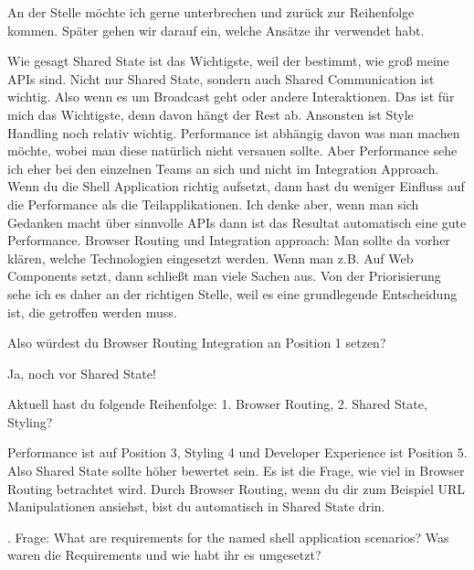 \begin{description}
    \NicoVogel An der Stelle möchte ich gerne unterbrechen und zurück zur Reihenfolge kommen. Später gehen wir darauf ein, welche Ansätze ihr verwendet habt.

    \BerndOlleck Wie gesagt Shared State ist das Wichtigste, weil der bestimmt, wie groß meine APIs sind. Nicht nur Shared State, sondern auch Shared Communication ist wichtig. Also wenn es um Broadcast geht oder andere Interaktionen. Das ist für mich das Wichtigste, denn davon hängt der Rest ab.
    Ansonsten ist Style Handling noch relativ wichtig. Performance ist abhängig davon was man machen möchte, wobei man diese natürlich nicht versauen sollte. Aber Performance sehe ich eher bei den einzelnen Teams an sich und nicht im Integration Approach. Wenn du die Shell Application richtig aufsetzt, dann hast du weniger Einfluss auf die Performance als die Teilapplikationen. Ich denke aber, wenn man sich Gedanken macht über sinnvolle APIs dann ist das Resultat automatisch eine gute Performance.
    Browser Routing und Integration approach: Man sollte da vorher klären, welche Technologien eingesetzt werden. Wenn man z.B. Auf Web Components setzt, dann schließt man viele Sachen aus. Von der Priorisierung sehe ich es daher an der richtigen Stelle, weil es eine grundlegende Entscheidung ist, die getroffen werden muss.

    \NicoVogel Also würdest du Browser Routing Integration an Position 1 setzen?

    \BerndOlleck Ja, noch vor Shared State!

    \NicoVogel Aktuell hast du folgende Reihenfolge: 1. Browser Routing, 2. Shared State, Styling?

    \BerndOlleck Performance ist auf Position 3, Styling 4 und Developer Experience ist Position 5. Also Shared State sollte höher bewertet sein. Es ist die Frage, wie viel in Browser Routing betrachtet wird. Durch Browser Routing, wenn du dir zum Beispiel URL Manipulationen ansiehst, bist du automatisch in Shared State drin.

    . Frage: What are requirements for the named shell application scenarios? Was waren die Requirements und wie habt ihr es umgesetzt?


\end{description}
